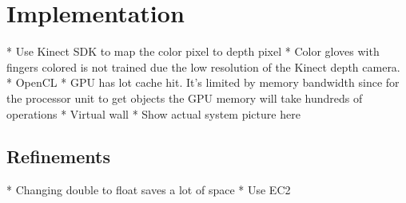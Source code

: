 \section{Implementation}
* Use Kinect SDK to map the color pixel to depth pixel
* Color gloves with fingers colored is not trained due the low resolution of the Kinect depth camera.
* OpenCL
* GPU has lot cache hit. It's limited by memory bandwidth since for the processor unit to get objects the GPU memory will take hundreds of operations
* Virtual wall
* Show actual system picture here


\subsection{Refinements}
* Changing double to float saves a lot of space
* Use EC2